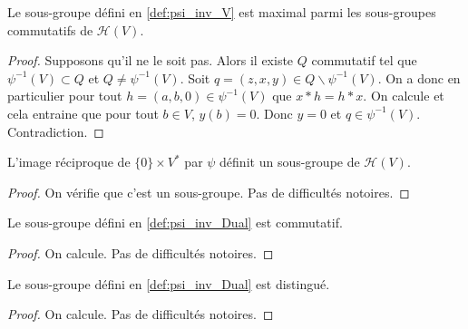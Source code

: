 \begin{proposition}
    \label{prop:psi_inv_V_max}
    \leanok

    Le sous-groupe défini en \ref{def:psi_inv_V} est maximal parmi les sous-groupes
    commutatifs de $\mathcal{H}(V)$.
    \begin{proof}
        \leanok 
        Supposons qu'il ne le soit pas. Alors il existe $Q$ commutatif tel que
        $\psi^{-1}(V)\subset Q$ et $Q\ne \psi^{-1}(V)$. Soit $q=(z,x,y)\in Q\backslash \psi^{-1}(V)$.
        On a donc en particulier pour tout $h=(a,b,0)\in \psi^{-1}(V)$ que $x*h=h*x$. On 
        calcule et cela entraine que pour tout $b\in V$, $y(b)=0$. Donc $y=0$ et $q\in \psi^{-1}(V)$.
        Contradiction.
    \end{proof}
\end{proposition}

\begin{definition}[$\psi^{-1}(V)$]
    \label{def:psi_inv_Dual}
    \leanok 

    L'image réciproque de $\{0\}\times V^*$ par $\psi$ définit un sous-groupe de $\mathcal{H}(V)$.
    \begin{proof}
        \leanok
        On vérifie que c'est un sous-groupe. Pas de difficultés notoires.
    \end{proof}
\end{definition}
    
\begin{proposition}
    \label{prop:psi_inv_Dual_comm}
    \leanok

    Le sous-groupe défini en \ref{def:psi_inv_Dual} est commutatif.
    \begin{proof}
        \leanok
        On calcule. Pas de difficultés notoires.
    \end{proof}
\end{proposition}

\begin{proposition}
    \label{prop:psi_inv_Dual_normal}
    \leanok

    Le sous-groupe défini en \ref{def:psi_inv_Dual} est distingué.
    \begin{proof}
        \leanok 
        On calcule. Pas de difficultés notoires.
    \end{proof}
\end{proposition}

